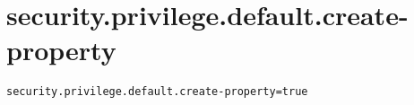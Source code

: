\section{security.privilege.default.create-property}
\label{configuration:SecurityPrivilegeDefaultCreateProperty}
\ClearAPI
\TODO
{}
\begin{lstlisting}[style=Props,caption={Usage example for \textit{security.privilege.default.create-property}}]
security.privilege.default.create-property=true
\end{lstlisting}